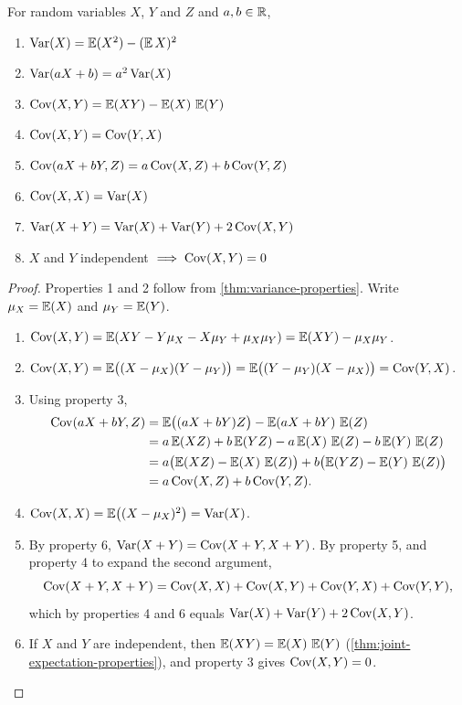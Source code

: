 \begin{theorem}\label{thm:covariance-properties}
For random variables $X$, $Y$ and $Z$ and $a, b \in \R$,
\begin{enumerate}
  \item $\Var(X) = \E(X^2) - (\E X)^2$
  \item $\Var(aX + b) = a^2 \Var(X)$
  \item $\Cov(X, Y) = \E(XY) - \E(X) \, \E(Y)$
  \item $\Cov(X, Y) = \Cov(Y, X)$
  \item $\Cov(aX + bY, Z) = a \Cov(X, Z) + b \Cov(Y, Z)$
  \item $\Cov(X, X) = \Var(X)$
  \item $\Var(X + Y) = \Var(X) + \Var(Y) + 2\Cov(X, Y)$
  \item $X$ and $Y$ independent $\implies \Cov(X, Y) = 0$
\end{enumerate}
\end{theorem}

\begin{proof}
Properties 1 and 2 follow from \cref{thm:variance-properties}. Write $\mu_X = \E(X)$ and $\mu_Y = \E(Y)$.
\begin{enumerate}[leftmargin=*]
  \item[3.] $\Cov(X, Y) = \E(XY - Y\mu_X - X\mu_Y + \mu_X\mu_Y) = \E(XY) - \mu_X\mu_Y$.
  \item[4.] $\Cov(X, Y) = \E\bigl((X - \mu_X)(Y - \mu_Y)\bigr) = \E\bigl((Y - \mu_Y)(X - \mu_X)\bigr) = \Cov(Y, X)$.
  \item[5.] Using property 3,
\begin{align*}
  \Cov(aX + bY, Z) &= \E\bigl((aX + bY)Z\bigr) - \E(aX + bY)\,\E(Z) \\
  &= a\E(XZ) + b \E(YZ) - a \E(X) \, \E(Z) - b \E(Y) \, \E(Z) \\
  &= a\bigl(\E(XZ) - \E(X)\,\E(Z)\bigr) + b\bigl(\E(YZ) - \E(Y)\,\E(Z)\bigr) \\
  &= a\Cov(X, Z) + b\Cov(Y, Z).
\end{align*}
  \item[6.] $\Cov(X, X) = \E\bigl((X - \mu_X)^2\bigr) = \Var(X)$.
  \item[7.] By property 6, $\Var(X + Y) = \Cov(X + Y, X + Y)$. By property 5, and property 4 to expand the second argument,
\[
  \Cov(X + Y, X + Y) = \Cov(X, X) + \Cov(X, Y) + \Cov(Y, X) + \Cov(Y, Y),
\]
which by properties 4 and 6 equals $\Var(X) + \Var(Y) + 2\Cov(X, Y)$.
  \item[8.] If $X$ and $Y$ are independent, then $\E(XY) = \E(X)\,\E(Y)$ (\cref{thm:joint-expectation-properties}), and property 3 gives $\Cov(X, Y) = 0$. \qedhere
\end{enumerate}
\end{proof}

